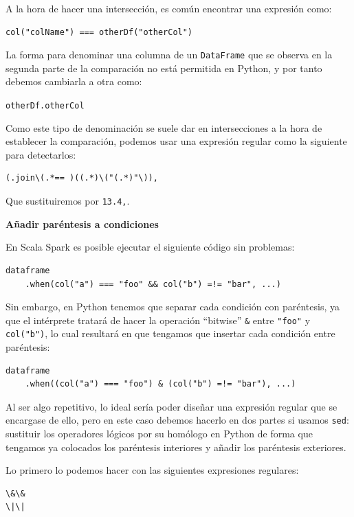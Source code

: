 \documentclass[12pt,twoside,titlepage]{report}
\newcommand{\quotes}[1]{``#1''}
\begin{document}
A la hora de hacer una intersección, es común encontrar una expresión como:

\begin{lstlisting}
col("colName") === otherDf("otherCol")
\end{lstlisting}

La forma para denominar una columna de un \texttt{DataFrame} que se observa en la segunda parte de la comparación no está permitida en Python, y por tanto debemos cambiarla a otra como:

\texttt{otherDf.otherCol}

Como este tipo de denominación se suele dar en intersecciones a la hora de establecer la comparación, podemos usar una expresión regular como la siguiente para detectarlos:

\begin{lstlisting}
(.join\(.*== )((.*)\("(.*)"\)),
\end{lstlisting}

Que sustituiremos por \texttt{13.4,}.

\textbf{Añadir paréntesis a condiciones}

En Scala Spark es posible ejecutar el siguiente código sin problemas:

\begin{lstlisting}
dataframe
	.when(col("a") === "foo" && col("b") =!= "bar", ...)
\end{lstlisting}

Sin embargo, en Python tenemos que separar cada condición con paréntesis, ya que el intérprete tratará de hacer la operación \quotes{bitwise} \texttt{\&} entre \texttt{"foo"} y \texttt{col("b")}, lo cual resultará en que tengamos que insertar cada condición entre paréntesis:

\begin{lstlisting}
dataframe
	.when((col("a") === "foo") & (col("b") =!= "bar"), ...)
\end{lstlisting}

Al ser algo repetitivo, lo ideal sería poder diseñar una expresión regular que se encargase de ello, pero en este caso debemos hacerlo en dos partes si usamos \texttt{sed}: sustituir los operadores lógicos por su homólogo en Python de forma que tengamos ya colocados los paréntesis interiores y añadir los paréntesis exteriores.

Lo primero lo podemos hacer con las siguientes expresiones regulares:

\begin{lstlisting}
\&\&
\|\|
\end{lstlisting}
\end{document}
